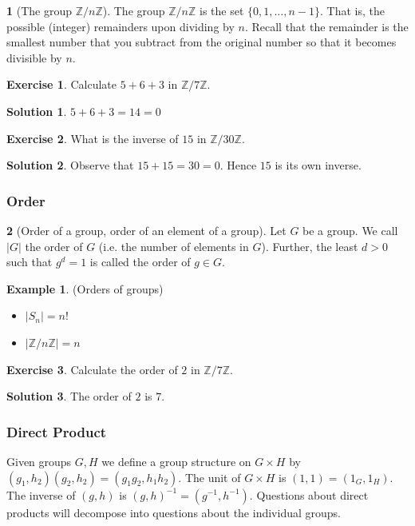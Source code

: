 \documentclass[12pt]{article}
\theoremstyle{definition}
\newtheorem{definition}{\color{NavyBlue}{\textbf{Definition}}}
\newtheorem{example}{\color{WildStrawberry}Example}
\newtheorem{exercise}{\color{YellowOrange}Exercise}
\theoremstyle{definition}
\newtheorem{solution}{\color{Goldenrod}Solution}
\begin{document}
\begin{definition}[The group $\mathbb{Z} / n \mathbb{Z}$]
The group $\mathbb{Z} / n \mathbb{Z}$ is the set $\{0,1,\ldots,n-1\}$. That is, the possible (integer) remainders upon dividing by $n$. Recall that the remainder is the smallest number that you subtract from the original number so that it becomes divisible by $n$. 
\end{definition}
\begin{exercise}
Calculate $5 + 6 + 3$ in $\mathbb{Z} / 7 \mathbb{Z}$.
\end{exercise}
\begin{solution}
$5 + 6+ 3 = 14 = 0$
\end{solution}
\begin{exercise}
What is the inverse of $15$ in $\mathbb{Z} / 30 \mathbb{Z}$.
\end{exercise}
\begin{solution}
Observe that $15 + 15 = 30 = 0$. Hence $15$ is its own inverse.
\end{solution}

\subsubsection{Order}

\begin{definition}[Order of a group, order of an element of a group]
Let $G$ be a group. We call $|G|$ the order of $G$ (i.e. the number of elements in $G$). Further, the least $d >0$ such that $g^d = 1$ is called the order of $g \in G$.
\end{definition}
\begin{example}(Orders of groups)
\begin{itemize}
\item $|S_n| = n!$
\item $|\mathbb{Z} / n \mathbb{Z}| = n$
\end{itemize}
\end{example}

\begin{exercise}
Calculate the order of $2$ in $\mathbb{Z} / 7 \mathbb{Z}$.
\end{exercise}
\begin{solution}
The order of $2$ is $7$.
\end{solution}

\subsubsection{Direct Product}
Given groups $G, H$ we define a group structure on $G \times H$ by $(g_1,h_2)(g_2,h_2) = (g_1g_2,h_1h_2)$. The unit of $G \times H$ is $(1,1) = (1_G, 1_H)$. The inverse of $(g,h)$ is $(g,h)^{-1} = (g^{-1}, h^{-1})$. Questions about direct products will decompose into questions about the individual groups. 
\end{document}
